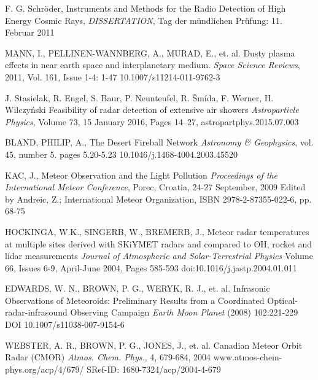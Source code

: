 \documentclass[twoside]{ctuthesis}
\theoremstyle{plain}
\theoremstyle{definition}
\theoremstyle{note}
\begin{document}
\appendix

\printindex

\appendix

\begin{thebibliography}{99}




F. G. Schröder, Instruments and Methods for the Radio Detection of High Energy Cosmic Rays,
\emph{DISSERTATION}, Tag der mündlichen Prüfung: 11. Februar 2011

MANN, I., PELLINEN-WANNBERG, A., MURAD, E., et. al.
Dusty plasma effects in near earth space and interplanetary medium.
\emph{Space Science Reviews}, 2011, Vol. 161, Issue 1-4: 1-47 
10.1007/s11214-011-9762-3 

J. Stasielak, R. Engel, S. Baur, P. Neunteufel, R. Šmída, F. Werner, H. Wilczyński
Feasibility of radar detection of extensive air showers
\emph{Astroparticle Physics}, Volume 73, 15 January 2016, Pages 14–27, astropartphys.2015.07.003 


BLAND, PHILIP, A.,
The Desert Fireball Network
\emph{Astronomy \& Geophysics}, vol. 45, number 5. pages 5.20-5.23
10.1046/j.1468-4004.2003.45520

KAC, J.,
Meteor Observation and the Light Pollution
\emph{Proceedings of the International Meteor Conference}, Porec, Croatia, 24-27 September, 2009 Edited by Andreic, Z.;  International Meteor Organization, ISBN 2978-2-87355-022-6, pp. 68-75

HOCKINGA, W.K., SINGERB, W., BREMERB, J.,
Meteor radar temperatures at multiple sites derived with SKiYMET radars and compared to OH, rocket and lidar measurements
\emph{Journal of Atmospheric and Solar-Terrestrial Physics}
Volume 66, Issues 6-9, April-June 2004, Pages 585-593
doi:10.1016/j.jastp.2004.01.011

EDWARDS, W. N., BROWN, P. G., WERYK, R. J., et. al.
Infrasonic Observations of Meteoroids: Preliminary Results from a Coordinated Optical-radar-infrasound Observing Campaign
\emph{Earth Moon Planet} (2008) 102:221-229
DOI 10.1007/s11038-007-9154-6

WEBSTER, A. R., BROWN, P. G., JONES, J., et. al.
Canadian Meteor Orbit Radar (CMOR)
\emph{Atmos. Chem. Phys.}, 4, 679-684, 2004
www.atmos-chem-phys.org/acp/4/679/
SRef-ID: 1680-7324/acp/2004-4-679


\end{thebibliography}
\end{document}
